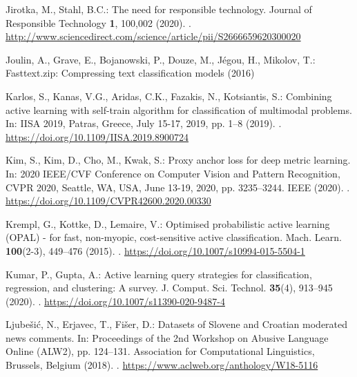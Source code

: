 \documentclass{article}
\begin{document}
\begin{thebibliography}{10}
Jirotka, M., Stahl, B.C.: The need for responsible technology.
\newblock Journal of Responsible Technology \textbf{1}, 100,002 (2020).
\newblock {}.
\newblock
  \urlprefix\url{http://www.sciencedirect.com/science/article/pii/S2666659620300020}

Joulin, A., Grave, E., Bojanowski, P., Douze, M., Jégou, H., Mikolov, T.:
  Fasttext.zip: Compressing text classification models (2016)

Karlos, S., Kanas, V.G., Aridas, C.K., Fazakis, N., Kotsiantis, S.: Combining
  active learning with self-train algorithm for classification of multimodal
  problems.
\newblock In: {IISA} 2019, Patras, Greece, July 15-17, 2019, pp. 1--8 (2019).
\newblock {}.
\newblock \urlprefix\url{https://doi.org/10.1109/IISA.2019.8900724}

Kim, S., Kim, D., Cho, M., Kwak, S.: Proxy anchor loss for deep metric
  learning.
\newblock In: 2020 {IEEE/CVF} Conference on Computer Vision and Pattern
  Recognition, {CVPR} 2020, Seattle, WA, USA, June 13-19, 2020, pp. 3235--3244.
  {IEEE} (2020).
\newblock {}.
\newblock \urlprefix\url{https://doi.org/10.1109/CVPR42600.2020.00330}

Krempl, G., Kottke, D., Lemaire, V.: Optimised probabilistic active learning
  {(OPAL)} - for fast, non-myopic, cost-sensitive active classification.
\newblock Mach. Learn. \textbf{100}(2-3), 449--476 (2015).
\newblock {}.
\newblock \urlprefix\url{https://doi.org/10.1007/s10994-015-5504-1}

Kumar, P., Gupta, A.: Active learning query strategies for classification,
  regression, and clustering: {A} survey.
\newblock J. Comput. Sci. Technol. \textbf{35}(4), 913--945 (2020).
\newblock {}.
\newblock \urlprefix\url{https://doi.org/10.1007/s11390-020-9487-4}

Ljube{\v{s}}i{\'c}, N., Erjavec, T., Fi{\v{s}}er, D.: Datasets of {S}lovene and
  {C}roatian moderated news comments.
\newblock In: Proceedings of the 2nd Workshop on Abusive Language Online
  ({ALW}2), pp. 124--131. Association for Computational Linguistics, Brussels,
  Belgium (2018).
\newblock {}.
\newblock \urlprefix\url{https://www.aclweb.org/anthology/W18-5116}


\end{thebibliography}
\end{document}
